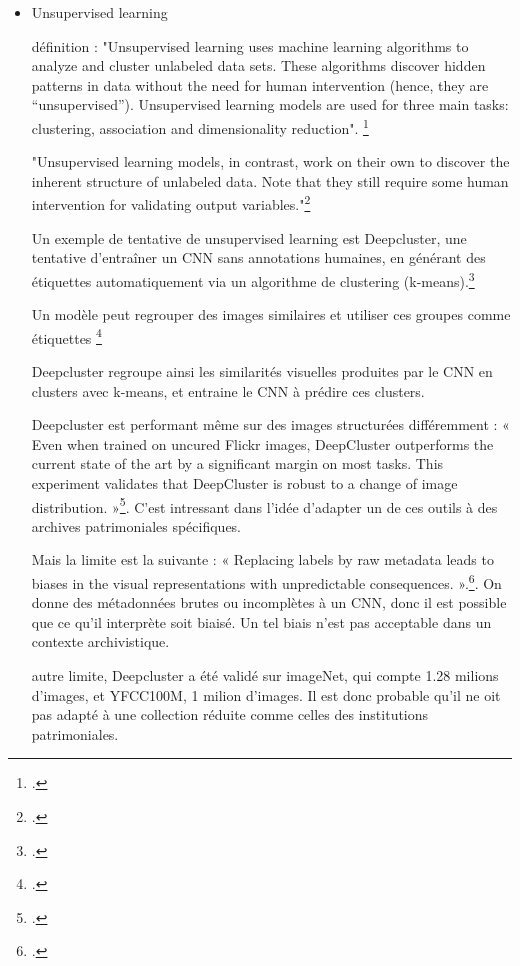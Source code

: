 \begin{itemize}
appliqué aux images, l'apprentissage supervisé suppose que chaque image fournie à une machine soit annotée par un humain \footcite{caron2018}

Cela suppose des heures de travail et des miliers d'annotations pour entraîner le modèle, ce que les institutions ne peuvent pas faire

\item Unsupervised learning

définition : 
"Unsupervised learning uses machine learning algorithms to analyze and cluster unlabeled data sets. These algorithms discover hidden patterns in data without the need for human intervention (hence, they are “unsupervised”).
Unsupervised learning models are used for three main tasks: clustering, association and dimensionality reduction". \footcite{delua2024}

"Unsupervised learning models, in contrast, work on their own to discover the inherent structure of unlabeled data. Note that they still require some human intervention for validating output variables."\footcite{delua2024}

Un exemple de tentative de unsupervised learning est Deepcluster, une tentative d'entraîner un CNN sans annotations humaines, en générant des étiquettes automatiquement via un algorithme de clustering (k-means).\footcite{caron2018}

Un modèle peut regrouper des images similaires et utiliser ces groupes comme étiquettes \footcite{caron2018}

Deepcluster regroupe ainsi les similarités visuelles produites par le CNN en clusters avec k-means, et entraine le CNN à prédire ces clusters. 

Deepcluster est performant même sur des images structurées différemment : « Even when trained on uncured Flickr images, DeepCluster outperforms the current state of the art by a significant margin on most tasks. This experiment validates that DeepCluster is robust to a change of image distribution. »\footcite{caron2018}. C'est intressant dans l'idée d'adapter un de ces outils à des archives patrimoniales spécifiques.

Mais la limite est la suivante : « Replacing labels by raw metadata leads to biases in the visual representations with unpredictable consequences. ».\footcite{caron2018}. On donne des métadonnées brutes ou incomplètes à un CNN, donc il est possible que ce qu'il interprète soit biaisé. Un tel biais n'est pas acceptable dans un contexte archivistique. 

autre limite, Deepcluster a été validé sur imageNet, qui compte 1.28 milions d'images, et YFCC100M, 1 milion d'images. Il est donc probable qu'il ne oit pas adapté à une collection réduite comme celles des institutions patrimoniales.



\end{itemize}